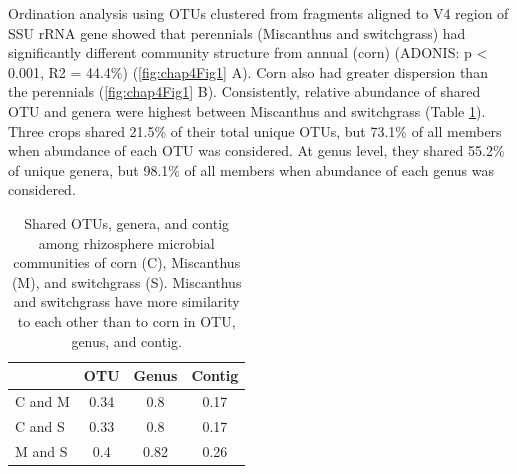 \documentclass[]{msu-thesis}
\begin{document}
Ordination analysis using OTUs clustered from fragments aligned to V4 region of SSU rRNA gene showed that perennials (Miscanthus and switchgrass) had significantly different community structure from annual (corn) (ADONIS: p < 0.001, R2 = 44.4\%) (\cref{fig:chap4Fig1} A). Corn also had greater dispersion than the perennials (\cref{fig:chap4Fig1} B). Consistently, relative abundance of shared OTU and genera were highest between Miscanthus and switchgrass (Table \ref{tab:chap4TabS3}). Three crops shared 21.5\% of their total unique OTUs, but 73.1\% of all members when abundance of each OTU was considered. At genus level, they shared 55.2\% of unique genera, but 98.1\% of all members when abundance of each genus was considered.



\begin{table}[htbp]
  \centering
  \caption[Shared OTUs, genera, and contig among three crops]{Shared OTUs, genera, and contig among rhizosphere microbial communities of corn (C), Miscanthus (M), and switchgrass (S). Miscanthus and switchgrass have more similarity to each other than to corn in OTU, genus, and contig.}
    \begin{tabular}{|lccc|}
    \toprule
          & OTU   & Genus & Contig \\
    \midrule
    C and M & 0.34  & 0.8   & 0.17 \\
    C and S & 0.33  & 0.8   & 0.17 \\
    M and S & 0.4   & 0.82  & 0.26 \\
    \bottomrule
    \end{tabular}%
  \label{tab:chap4TabS3}%
\end{table}%
\end{document}
